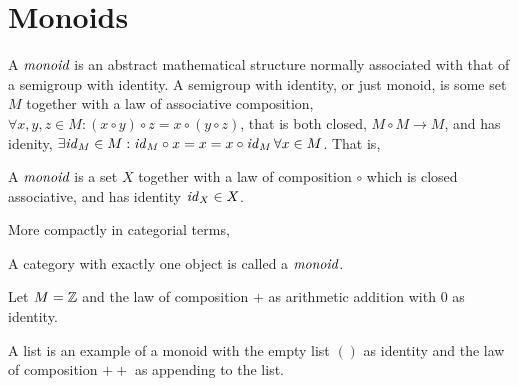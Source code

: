\section{Monoids} %
\label{sec:monoids}
A $\emph{monoid}$ is an abstract mathematical structure normally associated with that of a semigroup with identity.
A semigroup with identity, or just monoid, is some set $M$ together with a law of associative composition,
$\forall x,y,z \in M : (x \circ y) \circ z = x \circ (y \circ z)$, that is both closed, $M \circ M \to M$,
and has idenity, $\exists \mathit{id}_{M} \in M : \mathit{id}_{M} \circ x = x = x \circ \mathit{id}_{M} \, \forall x \in M$. That is,

\begin{defn}
 A $\emph{monoid}$ is a set $X$ together with a law of composition $\circ$
 which is closed associative, and has identity $\mathit{id}_{X} \in X$.
\end{defn}

More compactly in categorial terms,
\begin{defn}[Monoid]
 A category with exactly one object is called a $\emph{monoid}$.
\end{defn}

\begin{exmp}
 Let $M = \mathbb{Z}$ and the law of composition $+$ as arithmetic addition with $0$ as identity.
\end{exmp}

\begin{exmp}
 A list is an example of a monoid with the empty list $()$ as identity and the law of composition $++$ as appending to the list.
\end{exmp}


